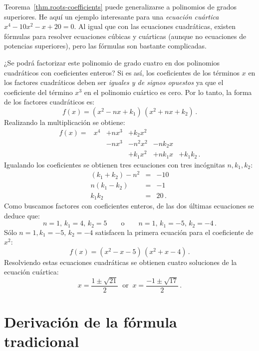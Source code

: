 \begin{example}
Teorema~\ref{thm.roots-coefficients} puede generalizarse a polinomios de grados superiores. He aquí un ejemplo interesante para una \emph{ecuación cuártica} $x^4-10x^2-x+20=0$. Al igual que con las ecuaciones cuadráticas, existen fórmulas para resolver ecuaciones cúbicas y cuárticas (aunque no ecuaciones de potencias superiores), pero las fórmulas son bastante complicadas.

¿Se podrá factorizar este polinomio de grado cuatro en dos polinomios cuadráticos con coeficientes enteros? Si es así, los coeficientes de los términos $x$ en los factores cuadráticos deben ser \emph{iguales y de signos opuestos} ya que el coeficiente del término $x^3$ en el polinomio cuártico es cero. Por lo tanto, la forma de los factores cuadráticos es:
\[
f(x) = (x^2 - nx + k_1)\, (x^2 + nx + k_2)\,.
\]
Realizando la multiplicación se obtiene:
\[
\renewcommand{\arraystretch}{1.1}
\begin{array}{rrrrrr}
f(x) = &x^4 & + nx^3 & + k_2 x^2\\
&& -nx^3 &- n^2x^2 &-nk_2x\\
&&&+k_1x^2 &+ nk_1x &+ k_1k_2\,.
\end{array}
\]
Igualando los coeficientes se obtienen tres ecuaciones con tres incógnitas $n,k_1,k_2$:
\begin{eqnarray*}
(k_1+k_2)-n^2 &=& -10\\
n(k_1-k_2) &=& -1\\
k_1k_2 &=& 20\,.
\end{eqnarray*}
Como buscamos factores con coeficientes enteros, de las dos últimas ecuaciones se deduce que:
\[
n=1,\,k_1=4,\,k_2=5  \quad\quad\textrm{o} \quad\quad n=1,\,k_1=-5,\, k_2=-4\,.
\]
Sólo $n=1,k_1=-5,\, k_2=-4$ satisfacen la primera ecuación para el coeficiente de $x^2$:
\[
f(x) = (x^2 - x - 5)\, (x^2 + x - 4)\,.
\]
Resolviendo estas ecuaciones cuadráticas se obtienen cuatro soluciones de la ecuación cuártica:
\[
x = \frac{1\pm\sqrt{21}}{2}  \;\;\textrm{or} \;\; x= \frac{-1\pm\sqrt{17}}{2} \,.
\]
\end{example}

\section{Derivación de la fórmula tradicional}\label{s.general}

